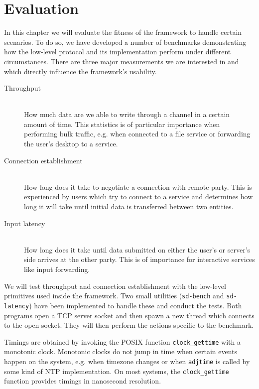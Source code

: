 \section{Evaluation}
\label{sec:evaluation}

In this chapter we will evaluate the fitness of the framework to handle certain scenarios.
To do so, we have developed a number of benchmarks demonstrating how the low-level protocol and its implementation perform under different circumstances.
There are three major measurements we are interested in and which directly influence the framework's usability.
\begin{description}
    \item[Throughput]\hfill\\
        How much data are we able to write through a channel in a certain amount of time.
        This statistics is of particular importance when performing bulk traffic, e.g. when connected to a file service or forwarding the user's desktop to a service.
    \item[Connection establishment]\hfill\\
        How long does it take to negotiate a connection with remote party.
        This is experienced by users which try to connect to a service and determines how long it will take until initial data is transferred between two entities.
    \item[Input latency]\hfill\\
        How long does it take until data submitted on either the user's or server's side arrives at the other party.
        This is of importance for interactive services like input forwarding.
\end{description}

We will test throughput and connection establishment with the low-level primitives used inside the framework.
Two small utilities (\lstinline{sd-bench} and \lstinline{sd-latency}) have been implemented to handle these and conduct the tests.
Both programs open a TCP server socket and then spawn a new thread which connects to the open socket.
They will then perform the actions specific to the benchmark.

Timings are obtained by invoking the POSIX function \lstinline{clock_gettime} with a monotonic clock.
Monotonic clocks do not jump in time when certain events happen on the system, e.g. when timezone changes or when \lstinline{adjtime} is called by some kind of NTP implementation.
On most systems, the \lstinline{clock_gettime} function provides timings in nanosecond resolution.

